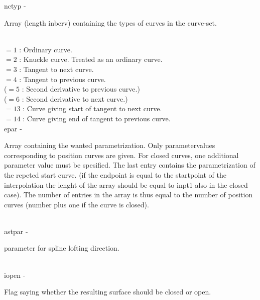         \>\>    {\fov nctyp}\> - \>  \begin{minipg2}
                     Array (length inbcrv) containing the types
                       of curves in the curve-set.
                               \end{minipg2}\\[0.8ex]
                \>\>\>\> $=1$ \> : Ordinary curve.\\
                \>\>\>\> $=2$ \> : Knuckle curve. Treated as an ordinary curve.\\
                \>\>\>\> $=3$ \> : Tangent to next curve.\\
                \>\>\>\> $=4$ \> : Tangent to previous curve.\\
                \>\>\>\> ($=5$ \> : Second derivative to previous curve.)\\
                \>\>\>\> ($=6$ \> : Second derivative to next curve.)\\
                \>\>\>\> $=13$ \> : Curve giving start of tangent to next curve.\\
                \>\>\>\> $=14$ \> : Curve giving end of tangent to previous curve.\\
        \>\>    {\fov epar}\> - \>  \begin{minipg2}
                     Array containing the wanted parametrization. Only
                       parametervalues corresponding to position
                       curves are given. For closed curves, one additional
                       parameter value must be spesified. The last entry
                       contains the parametrization of the repeted start
                       curve. (if the endpoint is equal to the startpoint
                       of the interpolation the lenght of the array should
                       be equal to inpt1 also in the closed case). The
                       number of entries in the array is thus equal to
                       the number of position curves (number plus one
                       if the curve is closed).
                               \end{minipg2}\\
        \>\>    {\fov astpar}\> - \>  \begin{minipg2}
                    parameter for spline lofting direction.
                               \end{minipg2}\\
        \>\>    {\fov iopen}\> - \>  \begin{minipg2}
                     Flag saying whether the resulting surface should
                       be closed or open.
                               \end{minipg2}\\
